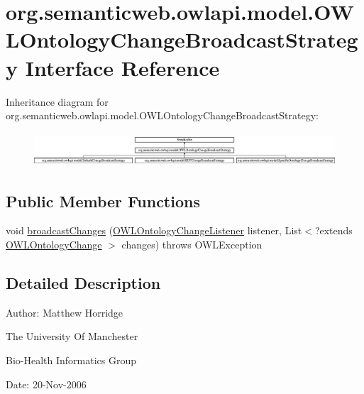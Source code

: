 \hypertarget{interfaceorg_1_1semanticweb_1_1owlapi_1_1model_1_1_o_w_l_ontology_change_broadcast_strategy}{\section{org.\-semanticweb.\-owlapi.\-model.\-O\-W\-L\-Ontology\-Change\-Broadcast\-Strategy Interface Reference}
\label{interfaceorg_1_1semanticweb_1_1owlapi_1_1model_1_1_o_w_l_ontology_change_broadcast_strategy}
}
Inheritance diagram for org.\-semanticweb.\-owlapi.\-model.\-O\-W\-L\-Ontology\-Change\-Broadcast\-Strategy\-:\begin{figure}[H]
\begin{center}
\leavevmode
\includegraphics[height=1.269841cm]{interfaceorg_1_1semanticweb_1_1owlapi_1_1model_1_1_o_w_l_ontology_change_broadcast_strategy}
\end{center}
\end{figure}
\subsection*{Public Member Functions}
\begin{DoxyCompactItemize}
\item 
void \hyperlink{interfaceorg_1_1semanticweb_1_1owlapi_1_1model_1_1_o_w_l_ontology_change_broadcast_strategy_aff0af05060687595e75516babad11ad3}{broadcast\-Changes} (\hyperlink{interfaceorg_1_1semanticweb_1_1owlapi_1_1model_1_1_o_w_l_ontology_change_listener}{O\-W\-L\-Ontology\-Change\-Listener} listener, List$<$?extends \hyperlink{classorg_1_1semanticweb_1_1owlapi_1_1model_1_1_o_w_l_ontology_change}{O\-W\-L\-Ontology\-Change} $>$ changes)  throws O\-W\-L\-Exception
\end{DoxyCompactItemize}


\subsection{Detailed Description}
Author\-: Matthew Horridge\par
 The University Of Manchester\par
 Bio-\/\-Health Informatics Group\par
 Date\-: 20-\/\-Nov-\/2006\par
\par
 

